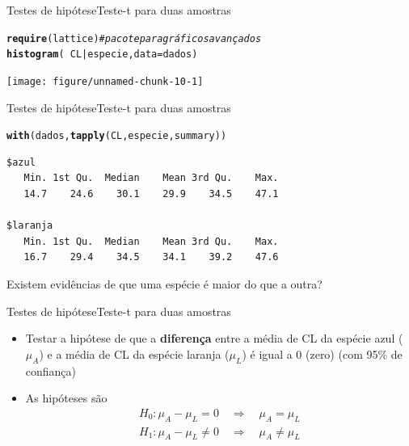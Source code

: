 \documentclass[10pt]{beamer}\usepackage[]{graphicx}\usepackage[]{color}
\makeatletter
\newcommand{\hlcom}[1]{\textcolor[rgb]{0.678,0.584,0.686}{\textit{#1}}}%
\newcommand{\hlopt}[1]{\textcolor[rgb]{0,0,0}{#1}}%
\newcommand{\hlstd}[1]{\textcolor[rgb]{0.345,0.345,0.345}{#1}}%
\newcommand{\hlkwc}[1]{\textcolor[rgb]{0.333,0.667,0.333}{#1}}%
\newcommand{\hlkwd}[1]{\textcolor[rgb]{0.737,0.353,0.396}{\textbf{#1}}}%
\newenvironment{kframe}{%
 \def\at@end@of@kframe{}%
 \ifinner\ifhmode%
  \def\at@end@of@kframe{\end{minipage}}%
  \begin{minipage}{\columnwidth}%
 \fi\fi%
 \def\FrameCommand##1{\hskip\@totalleftmargin \hskip-\fboxsep
 \colorbox{shadecolor}{##1}\hskip-\fboxsep
     \hskip-\linewidth \hskip-\@totalleftmargin \hskip\columnwidth}%
 \MakeFramed {\advance\hsize-\width
   \@totalleftmargin\z@ \linewidth\hsize
   \@setminipage}}%
 {\par\unskip\endMakeFramed%
 \at@end@of@kframe}
\newenvironment{knitrout}{}{} %
\theoremstyle{definition}
\makeatother
\begin{document}
\begin{frame}[fragile=singleslide]{Testes de hipótese}{Teste-t para duas amostras}
\begin{knitrout}\small
{}\color{fgcolor}\begin{kframe}
\begin{alltt}
\hlkwd{require}\hlstd{(lattice)} \hlcom{# pacote para gráficos avançados}
\hlkwd{histogram}\hlstd{(}\hlopt{~}\hlstd{CL} \hlopt{|} \hlstd{especie,} \hlkwc{data} \hlstd{= dados)}
\end{alltt}
\end{kframe}

{\centering \texttt{[image: figure/unnamed-chunk-10-1]} 

}



\end{knitrout}
\end{frame}

\begin{frame}[fragile=singleslide]{Testes de hipótese}{Teste-t para duas amostras}
\begin{knitrout}\small
{}\color{fgcolor}\begin{kframe}
\begin{alltt}
\hlkwd{with}\hlstd{(dados,} \hlkwd{tapply}\hlstd{(CL, especie, summary))}
\end{alltt}
\begin{verbatim}
$azul
   Min. 1st Qu.  Median    Mean 3rd Qu.    Max. 
   14.7    24.6    30.1    29.9    34.5    47.1 

$laranja
   Min. 1st Qu.  Median    Mean 3rd Qu.    Max. 
   16.7    29.4    34.5    34.1    39.2    47.6 
\end{verbatim}
\end{kframe}
\end{knitrout}
Existem evidências de que uma espécie é maior do que a outra?
\end{frame}

\begin{frame}[fragile=singleslide]{Testes de hipótese}{Teste-t para duas amostras}
  \begin{itemize}
  \item Testar a hipótese de que a \textbf{diferença} entre a média de
    CL da espécie azul ($\mu_A$) e a média de CL da espécie laranja
    ($\mu_L$) é igual a 0 (zero) (com 95\% de confiança)
  \item As hipóteses são
    \begin{align*}
      H_0: \mu_A - \mu_L = 0 \quad \Rightarrow \quad \mu_A = \mu_L \\
      H_1: \mu_A - \mu_L \neq 0 \quad \Rightarrow \quad \mu_A \neq \mu_L
    \end{align*}
  \end{itemize}
\end{frame}
\end{document}
